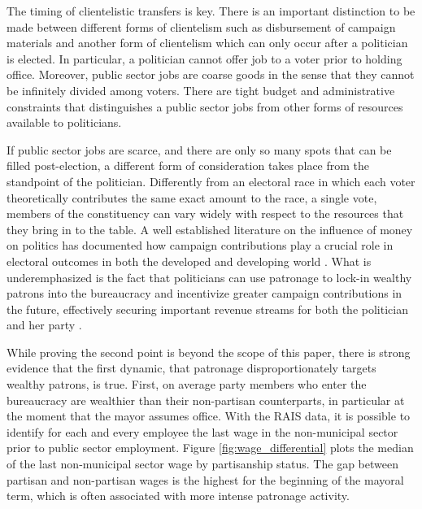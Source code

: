 The timing of clientelistic transfers is key. There is an important distinction to be made between different forms of clientelism such as disbursement of campaign materials \citep{stokes2005perverse,nichter2008vote} and another form of clientelism which can only occur after a politician is elected. In particular, a politician cannot offer job to a voter prior to holding office. Moreover, public sector jobs are coarse goods in the sense that they cannot be infinitely divided among voters. There are tight budget and administrative constraints that distinguishes a public sector jobs from other forms of resources available to politicians.

If public sector jobs are scarce, and there are only so many spots that can be filled post-election, a different form of consideration takes place from the standpoint of the politician. Differently from an electoral race in which each voter theoretically contributes the same exact amount to the race, a single vote, members of the constituency can vary widely with respect to the resources that they bring in to the table. A well established literature on the influence of money on politics has documented how campaign contributions play a crucial role in electoral outcomes in both the developed and developing world \citep{claessens2008political}. What is underemphasized is the fact that politicians can use patronage to lock-in wealthy patrons into the bureaucracy and incentivize greater campaign contributions in the future, effectively securing important revenue streams for both the politician and her party \citep{robinson2013political}.

While proving the second point is beyond the scope of this paper, there is strong evidence that the first dynamic, that patronage disproportionately targets wealthy patrons, is true. First, on average party members who enter the bureaucracy are wealthier than their non-partisan counterparts, in particular at the moment that the mayor assumes office. With the RAIS data, it is possible to identify for each and every employee the last wage in the non-municipal sector prior to public sector employment. Figure \ref{fig:wage_differential} plots the median of the last non-municipal sector wage by partisanship status. The gap between partisan and non-partisan wages is the highest for the beginning of the mayoral term, which is often associated with more intense patronage activity.

